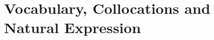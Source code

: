 \documentclass[
    12pt,
    a4paper,
    oneside,
    openany
]{book}
\begin{document}



\part{Vocabulary, Collocations and Natural Expression}

\end{document}
